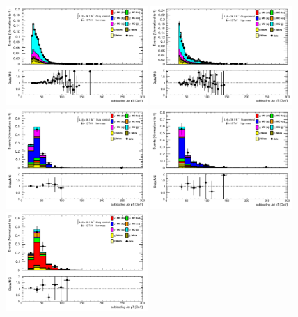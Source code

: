 \begin{figure}[p]
  \centering
  \includegraphics[width=0.48\textwidth]{chapters/chapter5_yybb/images/data_MC_comparison/h_CR_l_0t_nominal_subleadingJet_pt.pdf}
  \includegraphics[width=0.48\textwidth]{chapters/chapter5_yybb/images/data_MC_comparison/h_CR_h_0t_nominal_subleadingJet_pt.pdf}
  \includegraphics[width=0.48\textwidth]{chapters/chapter5_yybb/images/data_MC_comparison/h_SR_l_1t_nominal_subleadingJet_pt.pdf}
  \includegraphics[width=0.48\textwidth]{chapters/chapter5_yybb/images/data_MC_comparison/h_SR_h_1t_nominal_subleadingJet_pt.pdf}
  \includegraphics[width=0.48\textwidth]{chapters/chapter5_yybb/images/data_MC_comparison/h_SR_l_2t_nominal_subleadingJet_pt.pdf}

\end{figure}

